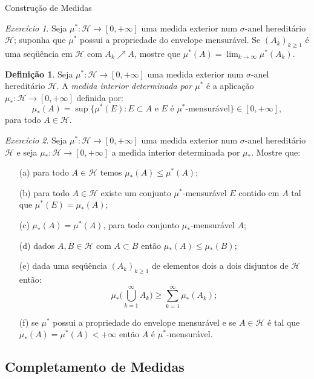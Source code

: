 \documentclass[oneside,final,11pt]{amsbook}
\theoremstyle{remark}\newtheorem{exercise}{Exercício}[chapter]
\theoremstyle{remark}\newtheorem{*exercise}[exercise]{\hbox to 0pt{\hskip 0pt minus 1fil*}Exercício}
\theoremstyle{definition}\newtheorem{exdefin}{Definição}[chapter]
\theoremstyle{plain}\newtheorem{teo}{Teorema}[section]
\theoremstyle{plain}\newtheorem{lem}[teo]{Lema}
\theoremstyle{plain}\newtheorem{prop}[teo]{Proposição}
\theoremstyle{plain}\newtheorem{cor}[teo]{Corolário}
\theoremstyle{definition}\newtheorem{defin}[teo]{Definição}
\theoremstyle{remark}\newtheorem{rem}[teo]{Observação}
\theoremstyle{definition}\newtheorem{notation}[teo]{Notação}
\theoremstyle{definition}\newtheorem{convention}[teo]{Convenção}
\theoremstyle{definition}\newtheorem{example}[teo]{Exemplo}
\numberwithin{section}{chapter}
\numberwithin{equation}{section}
\begin{document}
\begin{chapter}{Construção de Medidas}
\begin{exercise}
Seja $\mu^*:\mathcal H\to[0,+\infty]$ uma medida exterior num $\sigma$-anel hereditário
$\mathcal H$; suponha que $\mu^*$ possui a propriedade do envelope mensurável. Se
$(A_k)_{k\ge1}$ é uma seqüência em $\mathcal H$ com $A_k\nearrow A$, mostre que
$\mu^*(A)=\lim_{k\to\infty}\mu^*(A_k)$.
\end{exercise}

\begin{exdefin}
Seja $\mu^*:\mathcal H\to[0,+\infty]$ uma medida exterior num $\sigma$-anel hereditário
$\mathcal H$. A {\em medida interior determinada por $\mu^*$\/}
é a aplicação $\mu_*:\mathcal H\to[0,+\infty]$ definida por:
\[\mu_*(A)=\sup\big\{\mu^*(E):\text{$E\subset A$ e $E$ é $\mu^*$-mensurável}\big\}\in[0,+\infty],\]
para todo $A\in\mathcal H$.
\end{exdefin}

\begin{exercise}
Seja $\mu^*:\mathcal H\to[0,+\infty]$ uma medida exterior num $\sigma$-anel hereditário
$\mathcal H$ e seja $\mu_*:\mathcal H\to[0,+\infty]$ a medida interior determinada
por $\mu_*$. Mostre que:
\begin{itemize}
\item[(a)] para todo $A\in\mathcal H$ temos $\mu_*(A)\le\mu^*(A)$;
\item[(b)] para todo $A\in\mathcal H$ existe um conjunto $\mu^*$-mensurável $E$ contido
em $A$ tal que $\mu^*(E)=\mu_*(A)$;
\item[(c)] $\mu_*(A)=\mu^*(A)$, para todo conjunto $\mu_*$-mensurável $A$;
\item[(d)] dados $A,B\in\mathcal H$ com $A\subset B$ então $\mu_*(A)\le\mu_*(B)$;
\item[(e)] dada uma seqüência $(A_k)_{k\ge1}$ de elementos dois a dois disjuntos de
$\mathcal H$ então:
\[\mu_*\Big(\bigcup_{k=1}^\infty A_k\Big)\ge\sum_{k=1}^\infty\mu_*(A_k);\]
\item[(f)] se $\mu^*$ possui a propriedade do envelope mensurável e se $A\in\mathcal H$
é tal que $\mu_*(A)=\mu^*(A)<+\infty$ então $A$ é $\mu^*$-mensurável.
\end{itemize}
\end{exercise}

\subsection*{Completamento de Medidas}


\end{chapter}
\end{document}

